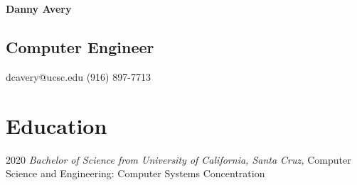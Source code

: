 \documentclass[12pt,letterpaper]{report}
\newcommand{\myname}{Danny Avery}
\newcommand{\namefont}[1]{{\normalfont\bfseries\Huge{#1}}}
\newcommand{\middlegap}{3.5em}
\newcommand{\verticalgap}{2em}
\newcommand{\degreegap}{1.9em}
\newcommand{\leftbody}{0.69\linewidth}
\newcommand{\rightcolumn}{0.21\linewidth}
\newcommand{\topandbottom}{\linewidth}
\begin{document}
	\raggedright
	\begin{minipage}[t]{\leftbody}
	\namefont{\myname}
	\vspace{\degreegap}
	\subsection*{Computer Engineer} 
	\end{minipage}
	\hspace{\middlegap}
	\begin{minipage}[t]{\rightcolumn}
		dcavery@ucsc.edu \newline
		(916) 897-7713%
	\end{minipage}
	\begin{minipage}[t]{\topandbottom}
	\vspace{\verticalgap}
	\section*{Education}
	\begin{tablist}
		\item[2020] \tab  \textit{Bachelor of Science from University of California, Santa Cruz,} \newline 
		 Computer Science and Engineering: Computer Systems Concentration 
	\end{tablist}	
	\end{minipage}
%
\end{document}
